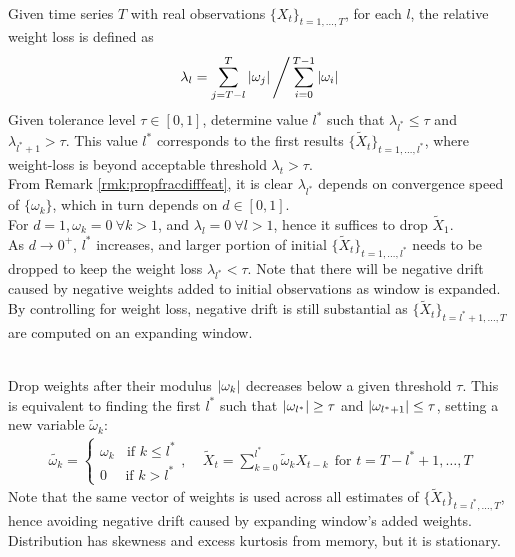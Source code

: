 \begin{method} \\
Given time series $T$ with real observations $\{X_t\}_{t = 1, \ldots, T}$, for each $l$, the relative weight loss is defined as
\begin{equation}
\lambda_l = \sum\limits_{j=T-l}^T \left\lvert\omega_j\right\rvert \Bigg/ \sum\limits_{i=0}^{T-1} \left\lvert\omega_i\right\rvert \nonumber
\end{equation}
Given tolerance level $\tau \in [0,1]$, determine value $l^*$ such that $\lambda_{l^*} \leq \tau$ and $\lambda_{l^* + 1} > \tau$. This value $l^*$ corresponds to the first results $\{\tilde{X}_t \}_{t = 1, \ldots, l^*}$, where weight-loss is beyond acceptable threshold $\lambda_t > \tau$.\\
From Remark \ref{rmk:propfracdifffeat}, it is clear $\lambda_{l^*}$ depends on convergence speed of $\{\omega_k \}$, which in turn depends on $d \in [0,1]$.\\
For $d = 1, \omega_k = 0 \ \forall k > 1$, and $\lambda_l = 0 \ \forall l > 1$, hence it suffices to drop $\tilde{X}_1$.\\
As $d \rightarrow 0^+$, $l^*$ increases, and larger portion of initial $\{\tilde{X}_t \}_{t = 1, \ldots, l^*}$ needs to be dropped to keep the weight loss $\lambda_{l^*} < \tau$. Note that there will be negative drift caused by negative weights added to initial observations as window is expanded. By controlling for weight loss, negative drift is still substantial as $\{\tilde{X}_t \}_{t = l^* + 1, \ldots, T}$ are computed on an expanding window.
\end{method}

\begin{method} \\
Drop weights after their modulus $\left\lvert\omega_k\right\rvert$ decreases below a given threshold $\tau$. This is equivalent to finding the first $l^*$ such that $\left\lvert\omega_{l^*}\right\rvert \geq \tau$ and $\left\lvert\omega_{l^* + 1}\right\rvert \leq \tau$, setting a new variable $\tilde{\omega}_k$:
\begin{align}
\tilde{\omega_k} = 
\begin{cases}
\omega_k \ \ \ \ \text{if } k \leq l^* \\
0 \ \ \ \ \ \ \text{if } k > l^*
\end{cases}, \ \ \ \ \
\tilde{X}_t = \sum\limits_{k=0}^{l^*} \tilde{\omega}_k X_{t-k} \ \ \text{for } t = T- l^* + 1, \ldots, T \nonumber
\end{align}
Note that the same vector of weights is used across all estimates of $\{\tilde{X}_t \}_{t = l^*, \ldots, T}$, hence avoiding negative drift caused by expanding window's added weights.\\
Distribution has skewness and excess kurtosis from memory, but it is stationary.
\end{method}